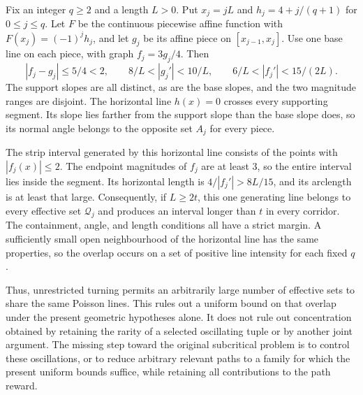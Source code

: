 \documentclass[11pt,letterpaper]{article}
\begin{document}
Fix an integer $q\ge2$ and a length $L>0$. Put $x_j=jL$ and $h_j=4+j/(q+1)$ for $0\le j\le q$. Let $F$ be the continuous piecewise affine function with $F(x_j)=(-1)^j h_j$, and let $g_j$ be its affine piece on $[x_{j-1},x_j]$. Use one base line on each piece, with graph $f_j=3g_j/4$. Then
\begin{equation}\label{eq:oscillation}
 |f_j-g_j|\le5/4<2,\qquad
 8/L<|g_j'|<10/L,\qquad
 6/L<|f_j'|<15/(2L).
\end{equation}
The support slopes are all distinct, as are the base slopes, and the two magnitude ranges are disjoint. The horizontal line $h(x)=0$ crosses every supporting segment. Its slope lies farther from the support slope than the base slope does, so its normal angle belongs to the opposite set $A_j$ for every piece.

The strip interval generated by this horizontal line consists of the points with $|f_j(x)|\le2$. The endpoint magnitudes of $f_j$ are at least $3$, so the entire interval lies inside the segment. Its horizontal length is $4/|f_j'|>8L/15$, and its arclength is at least that large. Consequently, if $L\ge2t$, this one generating line belongs to every effective set $\mathscr Q_j$ and produces an interval longer than $t$ in every corridor. The containment, angle, and length conditions all have a strict margin. A sufficiently small open neighbourhood of the horizontal line has the same properties, so the overlap occurs on a set of positive line intensity for each fixed $q$.

Thus, unrestricted turning permits an arbitrarily large number of effective sets to share the same Poisson lines. This rules out a uniform bound on that overlap under the present geometric hypotheses alone. It does not rule out concentration obtained by retaining the rarity of a selected oscillating tuple or by another joint argument. The missing step toward the original subcritical problem is to control these oscillations, or to reduce arbitrary relevant paths to a family for which the present uniform bounds suffice, while retaining all contributions to the path reward.



\end{document}
